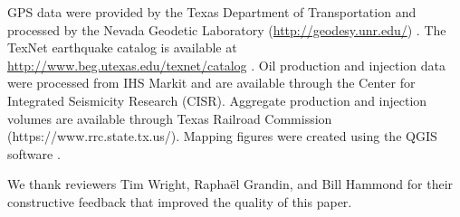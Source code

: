 \documentclass[draft]{agujournal2019}
\begin{document}
GPS data were provided by the Texas Department of Transportation and processed by the Nevada Geodetic Laboratory (\url{http://geodesy.unr.edu/}) \cite{Blewitt2018}. The TexNet earthquake catalog is available at \url{http://www.beg.utexas.edu/texnet/catalog} . Oil production and injection data were processed from IHS Markit and are available through the Center for Integrated Seismicity Research (CISR). Aggregate production and injection volumes are available through Texas Railroad Commission (https://www.rrc.state.tx.us/). Mapping figures were created using the QGIS software \cite{qgis}. 

We thank reviewers Tim Wright, Raphaël Grandin, and Bill Hammond for their constructive feedback that improved the quality of this paper.

%
%
\end{document}
